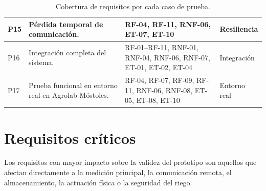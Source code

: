 \begin{table}[H]
\begin{tabular}{|p{}|p{}|p{}|p{}|}
\hline
P15 & Pérdida temporal de comunicación. & RF-04, RF-11, RNF-06, ET-07, ET-10 & Resiliencia \\
\hline
P16 & Integración completa del sistema. & RF-01--RF-11, RNF-01, RNF-04, RNF-06, RNF-07, ET-01, ET-02, ET-04 & Integración \\
\hline
P17 & Prueba funcional en entorno real en Agrolab Móstoles. & RF-04, RF-07, RF-09, RF-11, RNF-06, RNF-08, ET-05, ET-08, ET-10 & Entorno real \\
\hline
\end{tabular}
\caption{Cobertura de requisitos por cada caso de prueba.}
\label{tab:cobertura_pruebas_requisitos}
\end{table}

\section{Requisitos críticos}

Los requisitos con mayor impacto sobre la validez del prototipo son aquellos que afectan directamente a la medición principal, la comunicación remota, el almacenamiento, la actuación física o la seguridad del riego.


